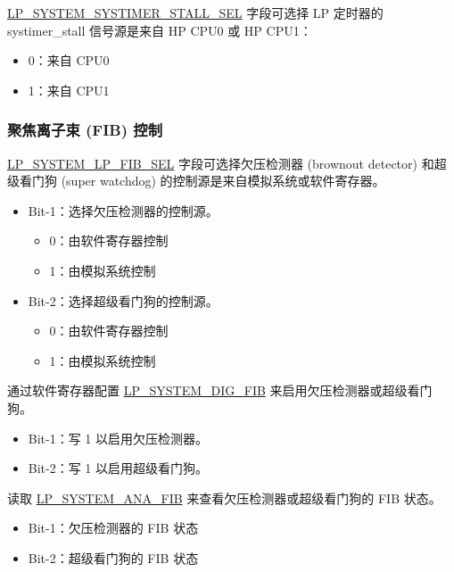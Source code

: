 \documentclass[main\_\_CN.tex]{subfiles}
\begin{document}
\hyperref[fielddesc:LPSYSTEMSYSTIMERSTALLSEL]{LP\_SYSTEM\_SYSTIMER\_STALL\_SEL} 字段可选择 LP 定时器的 systimer\_stall 信号源是来自 HP CPU0 或 HP CPU1：

\begin{itemize}
    \item 0：来自 CPU0
    \item 1：来自 CPU1
\end{itemize}

\subsubsection{聚焦离子束 (FIB) 控制}

\hyperref[fielddesc:LPSYSTEMLPFIBSEL]{LP\_SYSTEM\_LP\_FIB\_SEL} 字段可选择欠压检测器 (brownout detector) 和超级看门狗 (super watchdog) 的控制源是来自模拟系统或软件寄存器。

\begin{itemize}
    \item Bit-1：选择欠压检测器的控制源。
        \begin{itemize}
            \item 0：由软件寄存器控制
            \item 1：由模拟系统控制
        \end{itemize}
    \item Bit-2：选择超级看门狗的控制源。
        \begin{itemize}
            \item 0：由软件寄存器控制
            \item 1：由模拟系统控制
        \end{itemize}
\end{itemize}

通过软件寄存器配置 \hyperref[fielddesc:LPSYSTEMDIGFIB]{LP\_SYSTEM\_DIG\_FIB} 来启用欠压检测器或超级看门狗。
\begin{itemize}
    \item Bit-1：写 1 以启用欠压检测器。
    \item Bit-2：写 1 以启用超级看门狗。
\end{itemize}

读取 \hyperref[fielddesc:LPSYSTEMANAFIB]{LP\_SYSTEM\_ANA\_FIB} 来查看欠压检测器或超级看门狗的 FIB 状态。
\begin{itemize}
    \item Bit-1：欠压检测器的 FIB 状态
    \item Bit-2：超级看门狗的 FIB 状态
\end{itemize}
\end{document}

